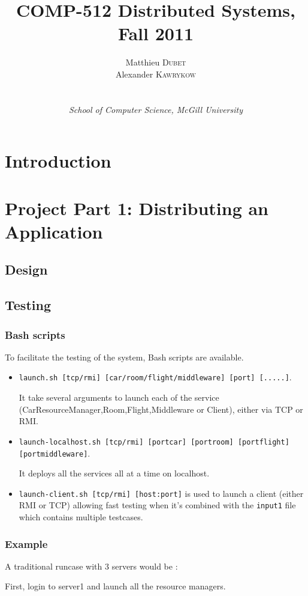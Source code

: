 \documentclass[a4paper]{article}
\title{COMP-512 Distributed Systems, Fall 2011}
\author{
Matthieu \textsc{Dubet} \\
Alexander \textsc{Kawrykow} \\ \\ \\
\emph{School of Computer Science, McGill University }
}
\begin{document}
\maketitle

\clearpage
\tableofcontents
\clearpage
\section{Introduction}
\section{Project Part 1: Distributing an Application}
\subsection{Design}



\subsection{Testing}
\subsubsection{Bash scripts}
To facilitate the testing of the system, Bash scripts are available.
\begin{itemize}
\item{
{\tt launch.sh [tcp/rmi] [car/room/flight/middleware] [port] [.....]}.

It take several arguments to launch each of the service (CarResourceManager,Room,Flight,Middleware or Client), either via TCP or RMI.
}
\item{
{\tt launch-localhost.sh [tcp/rmi] [portcar] [portroom] [portflight] [portmiddleware]}.

It deploys all the services all at a time on localhost.
}
\item{
{\tt launch-client.sh [tcp/rmi] [host:port]} is used to launch a client (either RMI or TCP) 
allowing fast testing when it's combined with the {\tt input1} file which contains multiple testcases.
}
\end{itemize}

\subsubsection{Example}
A traditional runcase with 3 servers would be :

First, login to server1 and launch all the resource managers.
\end{document}
